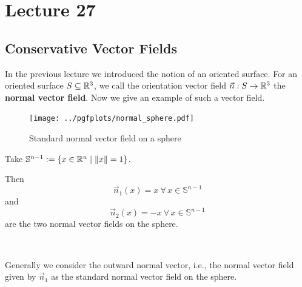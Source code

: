 \documentclass[../Analysis-3.tex]{subfiles}
\begin{document}
\chapter*{Lecture 27} %
\setcounter{chapter}{27} %
\setcounter{section}{0}
\setcounter{equation}{0}
\setcounter{figure}{0}


\section{Conservative Vector Fields}

In the previous lecture we introduced the notion of an oriented surface. For an oriented surface $S \subseteq \mathbb{R}^3$, we call the orientation vector field $\vec{n} : S \to \mathbb{R}^3$ the \textbf{normal vector field}. Now we give an example of such a vector field.

\begin{Eg}{}{}
  \begin{figure}
    \centering
    \texttt{[image: ../pgfplots/normal\_sphere.pdf]}
    \caption{Standard normal vector field on a sphere}\label{fig1:27}
  \end{figure}
  Take $\mathbb{S}^{n-1} := \{ x \in \mathbb{R}^n \mid \norm{x} = 1 \}$.

  Then
  \[ \vec{n}_1(x) = x \ \forall \, x \in \mathbb{S}^{n-1} \] and
  \[ \vec{n}_2(x) = -x \ \forall \, x \in \mathbb{S}^{n-1} \]
  are the two normal vector fields on the sphere.

  \

  Generally we consider the outward normal vector, i.e., the normal vector field given by $\vec{n}_1$ as the standard normal vector field on the sphere.
\end{Eg}

\
\end{document}
